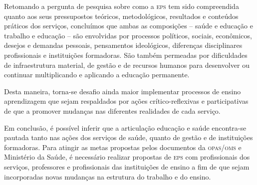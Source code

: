 \documentclass{article}
\begin{document}
Retomando a pergunta de pesquisa sobre como a \textsc{eps} tem sido compreendida quanto
aos seus pressupostos teóricos, metodológicos, resultados e conteúdos práticos
dos serviços, concluímos que ambas as composições – saúde e educação e trabalho
e educação – são envolvidas por processos políticos, sociais, econômicos,
desejos e demandas pessoais, pensamentos ideológicos, diferenças disciplinares
profissionais e instituições formadoras. São também permeadas por dificuldades
de infraestrutura material, de gestão e de recursos humanos para desenvolver ou
continuar multiplicando e aplicando a educação permanente.

Desta maneira, torna-se desafio ainda maior implementar processos de ensino
aprendizagem que sejam respaldados por ações crítico-reflexivas e participativas
de que a promover mudanças nas diferentes realidades de cada serviço.

Em conclusão, é possível inferir que a articulação educação e saúde encontra-se
pautada tanto nas ações dos serviços de saúde, quanto de gestão e de
instituições formadoras. Para atingir as metas propostas pelos documentos da
\textsc{opas}/\textsc{oms} e Ministério da Saúde, é necessário realizar propostas de \textsc{eps} com
profissionais dos serviços, professores e profissionais das instituições de
ensino a fim de que sejam incorporadas novas mudanças na estrutura do trabalho e
do ensino.
\end{document}
